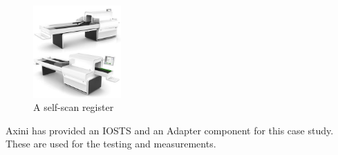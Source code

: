 \begin{figure}[ht]
  \begin{center}
    \includegraphics[width=0.3\textwidth]{scanflow.jpg}
  \end{center}
  \caption{A self-scan register}
  \label{fig:register}
\end{figure}

Axini has provided an IOSTS and an Adapter component for this case study. These are used for the testing and measurements.

